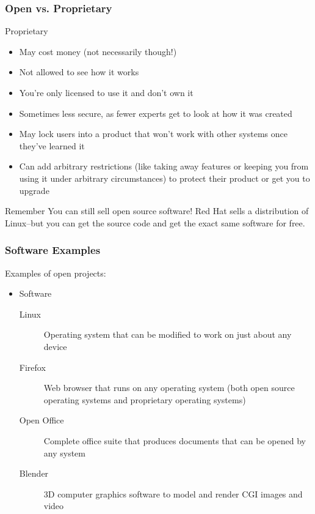 \documentclass{beamer}
\begin{document}
\begin{frame}
  \frametitle{Open vs. Proprietary}
  
  Proprietary
  \begin{itemize}
  \item May cost \textcolor{beamer@mygreen}{money} (not necessarily though!)
  \item \textcolor{beamer@mygreen}{Not} allowed to see how it works
  \item You're only \textcolor{beamer@mygreen}{licensed} to use it and don't own it
  \item Sometimes less \textcolor{beamer@mygreen}{secure}, as fewer experts get to look at how it was created
  \item May \textcolor{beamer@mygreen}{lock} users into a product that won't work with other systems once they've learned it
  \item Can add arbitrary \textcolor{beamer@mygreen}{restrictions} (like taking away features or keeping you from using it under arbitrary circumstances) to protect their product or get you to upgrade
  \end{itemize}

  \begin{block}{Remember}
    You can still sell open source software! Red Hat sells a distribution of Linux--but you can get the source code and get the exact same software for free.
  \end{block}

\end{frame}

\begin{frame}
  \frametitle{Software Examples}
  Examples of open projects:

  \begin{itemize}
  \item Software
    \begin{description}
    \item[Linux] Operating system that can be modified to work on just
      about any device
    \item[Firefox] Web browser that runs on any operating system (both
      open source operating systems and proprietary operating systems)
    \item[Open Office] Complete office suite that produces documents
      that can be opened by any system
    \item[Blender] 3D computer graphics software to model and render CGI images and video
    \end{description}
    \end{itemize}
\end{frame}
\end{document}
